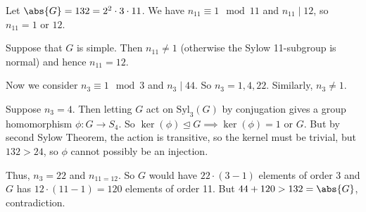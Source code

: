\begin{example}
    Let \(\abs{G} = 132 = 2^2\cdot 3 \cdot 11\). We have \(n_{11}\equiv 1 \mod 11\) and \(n_{11}\mid 12\), so \(n_{11}=1\) or \(12\).

    Suppose that \(G\) is simple. Then \(n_{11} \neq 1\) (otherwise the Sylow 11-subgroup is normal) and hence \(n_{11} = 12\).

    Now we consider \(n_3 \equiv 1 \mod 3\) and \(n_3 \mid 44\). So \(n_3 = 1, 4, 22\). Similarly, \(n_3 \neq 1\).

    Suppose \(n_3 = 4\). Then letting \(G\) act on \(\mathrm{Syl}_{3}(G)\) by conjugation gives a group homomorphism \(\phi: G \to S_4\). So \(\ker (\phi) \trianglelefteq G \implies \ker(\phi)=1\) or \(G\). But by second Sylow Theorem, the action is transitive, so the kernel must be trivial, but \(132 > 24\), so \(\phi\) cannot possibly be an injection.

    Thus, \(n_{3} = 22\) and \(n_{11 = 12}\). So \(G\) would have \(22\cdot(3-1)\) elements of order 3 and \(G\) has \(12 \cdot (11-1) = 120\) elements of order 11. But \(44 + 120 > 132 = \abs{G} \), contradiction.
\end{example}
